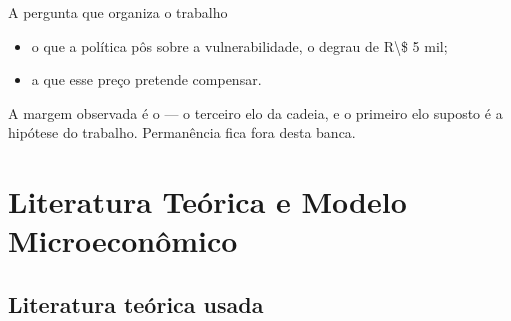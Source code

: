 \documentclass[aspectratio=169,10pt]{beamer}
\begin{document}
\begin{frame}{A pergunta que organiza o trabalho}
{{      \vspace{0.35em}
      {\small
      \begin{itemize}
        \setlength{\itemsep}{0.25em}
        \item o  que a política pôs sobre a vulnerabilidade, o
          degrau de \num{R\$ 5 mil};
        \item a  que esse preço pretende compensar.
      \end{itemize}}

      \vspace{0.6em}
      {\small A margem observada é o  --- o
      terceiro elo da cadeia, e o primeiro elo suposto é a hipótese do
      trabalho. Permanência fica fora desta banca.}}%
  }%

\end{frame}

\section{Literatura Teórica e Modelo Microeconômico}
\begin{frame}[plain]
\end{frame}

\subsection{Literatura teórica usada}
\end{document}
